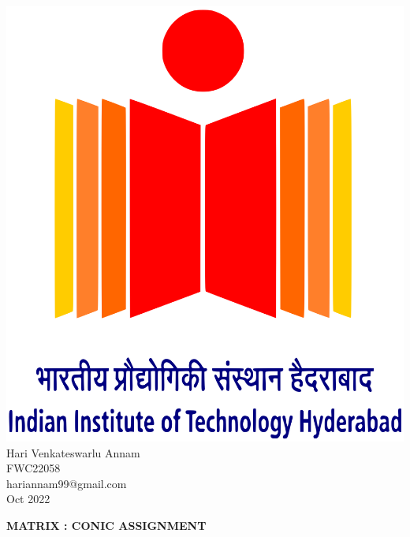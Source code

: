\documentclass[10pt,a4paper]{report}
\begin{document}
\begin{multicols}{2}
\raggedright {\includegraphics[scale=0.06]{iith_logo.png}} \vspace{3mm}\\ \raggedleft Hari Venkateswarlu Annam\vspace{2mm}\\ 
\raggedleft  FWC22058\vspace{2mm}\\ 
\raggedleft hariannam99@gmail.com \vspace{2mm}\\ 
\raggedleft Oct 2022 \vspace{5mm}\\
\end{multicols}

\centering \Large \textbf{MATRIX : CONIC ASSIGNMENT} \normalsize \vspace{10mm}
\end{document}

